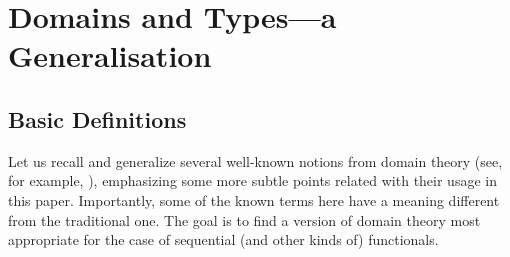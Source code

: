 \documentclass[fleqn]{LMCS}
\theoremstyle{plain}\newtheorem{satz}[thm]{Satz}
\theoremstyle{plain}\newtheorem{hyp}[thm]{Hypothesis}
\theoremstyle{plain}\newtheorem{hyps}[thm]{Hypotheses}
\theoremstyle{definition}\newtheorem{note}[thm]{Note}
\newcommand{\?}{\mbox{?}}
\begin{document}
\section{Domains and Types---a Generalisation}
\label{sec:prelim}

\subsection{Basic Definitions}\label{sec:basic-def}


\noindent
Let us recall and generalize several well-known notions from domain theory 
(see, for example, \cite{Abramsky-Jung1994,Plo81}), 
emphasizing some more subtle points related with 
their usage in this paper.  
Importantly,  
some of the known terms here have a meaning different from the traditional one. 
The goal is to find a version of domain theory most appropriate for the case 
of sequential (and other kinds of) functionals. 
\end{document}
